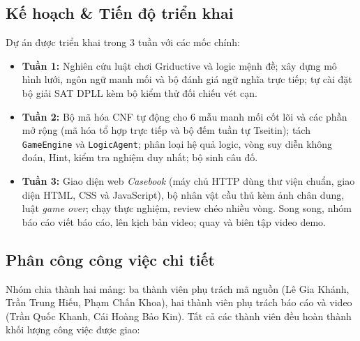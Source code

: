 \documentclass{article}
\newcommand{\code}[1]{\texttt{#1}}
\begin{document}
\subsection{Kế hoạch \& Tiến độ triển khai}
Dự án được triển khai trong 3 tuần với các mốc chính:
\begin{itemize}[noitemsep]
    \item \textbf{Tuần 1:} Nghiên cứu luật chơi Griductive và logic mệnh đề; xây dựng mô hình lưới, ngôn ngữ manh mối và bộ đánh giá ngữ nghĩa trực tiếp; tự cài đặt bộ giải SAT DPLL kèm bộ kiểm thử đối chiếu vét cạn.
    \item \textbf{Tuần 2:} Bộ mã hóa CNF tự động cho 6 mẫu manh mối cốt lõi và các phần mở rộng (mã hóa tổ hợp trực tiếp và bộ đếm tuần tự Tseitin); tách \code{GameEngine} và \code{LogicAgent}; phân loại hệ quả logic, vòng suy diễn không đoán, Hint, kiểm tra nghiệm duy nhất; bộ sinh câu đố.
    \item \textbf{Tuần 3:} Giao diện web \textit{Casebook} (máy chủ HTTP dùng thư viện chuẩn, giao diện HTML, CSS và JavaScript), bộ nhân vật cầu thủ kèm ảnh chân dung, luật \textit{game over}; chạy thực nghiệm, review chéo nhiều vòng. Song song, nhóm báo cáo viết báo cáo, lên kịch bản video; quay và biên tập video demo.
\end{itemize}

\subsection{Phân công công việc chi tiết}
Nhóm chia thành hai mảng: ba thành viên phụ trách mã nguồn (Lê Gia Khánh, Trần Trung Hiếu, Phạm Chấn Khoa), hai thành viên phụ trách báo cáo và video (Trần Quốc Khanh, Cái Hoàng Bảo Kin). Tất cả các thành viên đều hoàn thành khối lượng công việc được giao:
\end{document}
